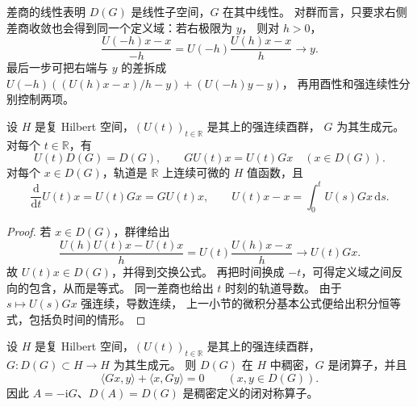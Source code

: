 差商的线性表明 \(D(G)\) 是线性子空间，\(G\) 在其中线性。
对群而言，只要求右侧差商收敛也会得到同一个定义域：若右极限为 \(y\)，
则对 \(h>0\)，
\[
 \frac{U(-h)x-x}{-h}
 =U(-h)\frac{U(h)x-x}{h}\longrightarrow y.
\]
最后一步可把右端与 \(y\) 的差拆成
\(U(-h)((U(h)x-x)/h-y)+(U(-h)y-y)\)，
再用酉性和强连续性分别控制两项。

\begin{proposition}[定义域不变与轨道积分式]
\label{b1:prop:29-group-orbits}
设 \(H\) 是复 Hilbert 空间，\((U(t))_{t\in\mathbb R}\) 是其上的强连续酉群，
\(G\) 为其生成元。对每个 \(t\in\mathbb R\)，有
\[
 U(t)D(G)=D(G),\qquad GU(t)x=U(t)Gx\quad(x\in D(G)).
\]
对每个 \(x\in D(G)\)，轨道是 \(\mathbb R\) 上连续可微的 \(H\) 值函数，且
\begin{equation}\label{b1:eq:29-group-orbit-derivative}
 \frac{\mathrm d}{\mathrm dt}U(t)x=U(t)Gx=GU(t)x,
 \qquad
 U(t)x-x=\int_0^tU(s)Gx\,\mathrm ds.
\end{equation}
\end{proposition}

\begin{proof}
若 \(x\in D(G)\)，群律给出
\[
 \frac{U(h)U(t)x-U(t)x}{h}
 =U(t)\frac{U(h)x-x}{h}\longrightarrow U(t)Gx.
\]
故 \(U(t)x\in D(G)\)，并得到交换公式。
再把时间换成 \(-t\)，可得定义域之间反向的包含，从而是等式。
同一差商也给出 \(t\) 时刻的轨道导数。
由于 \(s\mapsto U(s)Gx\) 强连续，导数连续，
上一小节的微积分基本公式便给出积分恒等式，包括负时间的情形。
\end{proof}

\begin{proposition}
\label{b1:prop:29-generator-closed}
设 \(H\) 是复 Hilbert 空间，\((U(t))_{t\in\mathbb R}\) 是其上的强连续酉群，
\(G:D(G)\subset H\to H\) 为其生成元。
则 \(D(G)\) 在 \(H\) 中稠密，\(G\) 是闭算子，并且
\begin{equation}\label{b1:eq:29-generator-skew-symmetry}
 \langle Gx,y\rangle+\langle x,Gy\rangle=0
 \qquad(x,y\in D(G)).
\end{equation}
因此 \(A=-\mathrm iG\)、\(D(A)=D(G)\) 是稠密定义的闭对称算子。
\end{proposition}

